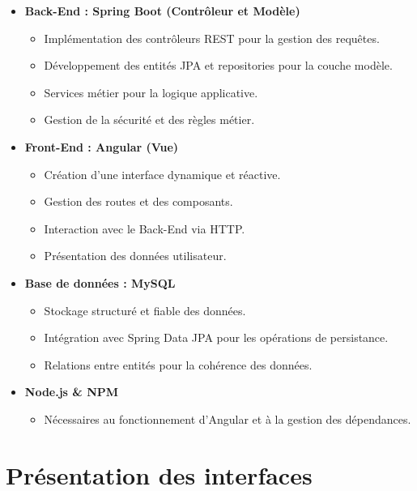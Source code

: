\begin{itemize}
    \item \textbf{Back-End : Spring Boot (Contrôleur et Modèle)}
    \begin{itemize}
        \item Implémentation des contrôleurs REST pour la gestion des requêtes.
        \item Développement des entités JPA et repositories pour la couche modèle.
        \item Services métier pour la logique applicative.
        \item Gestion de la sécurité et des règles métier.
    \end{itemize}

    \item \textbf{Front-End : Angular (Vue)}
    \begin{itemize}
        \item Création d'une interface dynamique et réactive.
        \item Gestion des routes et des composants.
        \item Interaction avec le Back-End via HTTP.
        \item Présentation des données utilisateur.
    \end{itemize}

    \item \textbf{Base de données : MySQL}
    \begin{itemize}
        \item Stockage structuré et fiable des données.
        \item Intégration avec Spring Data JPA pour les opérations de persistance.
        \item Relations entre entités pour la cohérence des données.
    \end{itemize}

    \item \textbf{Node.js \& NPM}
    \begin{itemize}
        \item Nécessaires au fonctionnement d'Angular et à la gestion des dépendances.
    \end{itemize}
\end{itemize}


\section{Présentation des interfaces}

